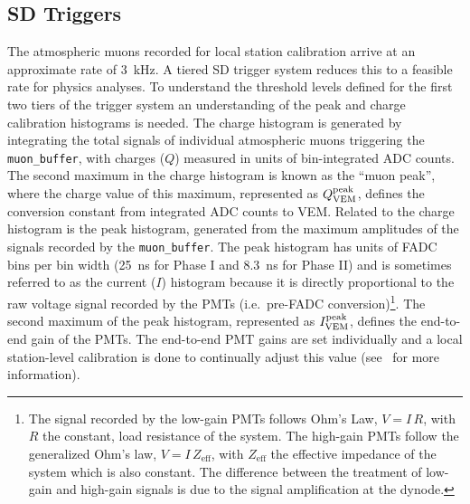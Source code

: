 \subsection{SD Triggers}\label{ssec:sd_triggers}

The atmospheric muons recorded for local station calibration arrive at an approximate rate of \qty{3}{\kilo\hertz}.
A tiered SD trigger system reduces this to a feasible rate for physics analyses.
To understand the threshold levels defined for the first two tiers of the trigger system an understanding of the peak and charge calibration histograms is needed.
The charge histogram is generated by integrating the total signals of individual atmospheric muons triggering the \texttt{muon\_buffer}, with charges ($Q$) measured in units of bin-integrated ADC counts.
The second maximum in the charge histogram is known as the ``muon peak'', where the charge value of this maximum, represented as $Q_{\rm VEM}^{\rm peak}$, defines the conversion constant from integrated ADC counts to VEM.
Related to the charge histogram is the peak histogram, generated from the maximum amplitudes of the signals recorded by the \texttt{muon\_buffer}.
The peak histogram has units of FADC bins per bin width (\qty{25}{\nano\second} for Phase I and \qty{8.3}{\nano\second} for Phase II) and is sometimes referred to as the current ($I$) histogram because it is directly proportional to the raw voltage signal recorded by the PMTs (i.e.~pre-FADC conversion)\footnote[1]{The signal recorded by the low-gain PMTs follows Ohm's Law, $V=I\,R$, with $R$ the constant, load resistance of the system. The high-gain PMTs follow the generalized Ohm's law, $V=I\,Z_{\text{eff}}$, with $Z_{\text{eff}}$ the effective impedance of the system which is also constant. The difference between the treatment of low-gain and high-gain signals is due to the signal amplification at the dynode.}.
The second maximum of the peak histogram, represented as $I_{\rm VEM}^{\rm peak}$, defines the end-to-end gain of the PMTs.
The end-to-end PMT gains are set individually and a local station-level calibration is done to continually adjust this value (see~\cite{auger_nima2006_sdcalibration} for more information).

